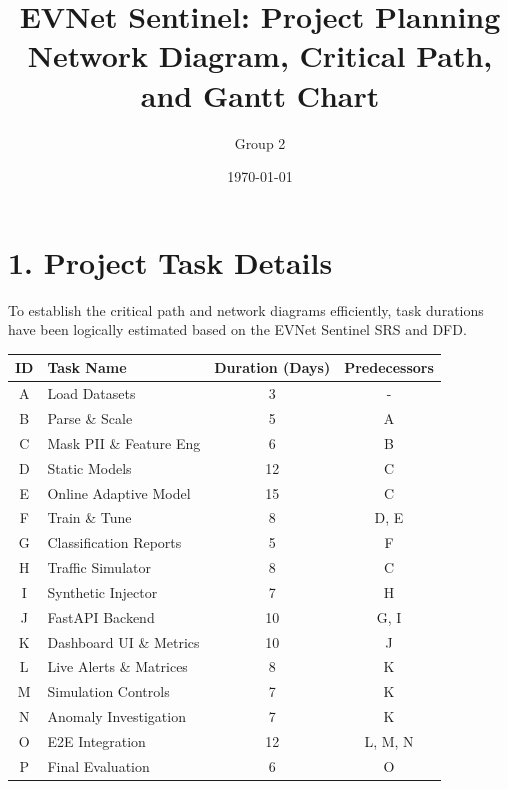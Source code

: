 \documentclass[11pt, a4paper, landscape]{article}
\title{\textbf{EVNet Sentinel: Project Planning}\\ \vspace{0.5cm} Network Diagram, Critical Path, and Gantt Chart}
\author{Group 2}
\date{\today}
\begin{document}
\maketitle
\newpage

\section*{1. Project Task Details}
To establish the critical path and network diagrams efficiently, task durations have been logically estimated based on the EVNet Sentinel SRS and DFD.

\vspace{0.5cm}
\begin{center}
\begin{tabular}{|c|l|c|c|}
\hline
\textbf{ID} & \textbf{Task Name} & \textbf{Duration (Days)} & \textbf{Predecessors} \\ \hline
A & Load Datasets & 3 & - \\ \hline
B & Parse \& Scale & 5 & A \\ \hline
C & Mask PII \& Feature Eng & 6 & B \\ \hline
D & Static Models & 12 & C \\ \hline
E & Online Adaptive Model & 15 & C \\ \hline
F & Train \& Tune & 8 & D, E \\ \hline
G & Classification Reports & 5 & F \\ \hline
H & Traffic Simulator & 8 & C \\ \hline
I & Synthetic Injector & 7 & H \\ \hline
J & FastAPI Backend & 10 & G, I \\ \hline
K & Dashboard UI \& Metrics & 10 & J \\ \hline
L & Live Alerts \& Matrices & 8 & K \\ \hline
M & Simulation Controls & 7 & K \\ \hline
N & Anomaly Investigation & 7 & K \\ \hline
O & E2E Integration & 12 & L, M, N \\ \hline
P & Final Evaluation & 6 & O \\ \hline
\end{tabular}
\end{center}

\newpage
\end{document}
